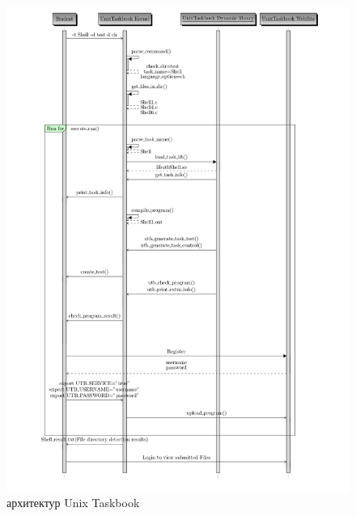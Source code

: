 \begin{figure}[htbp]%
    \centering
    \includegraphics[width=0.68\linewidth]{images/utb.jpg}%
    \caption{архитектур Unix Taskbook\cite{ref20}}%
    \label{utb}%
\end{figure}

\newpage